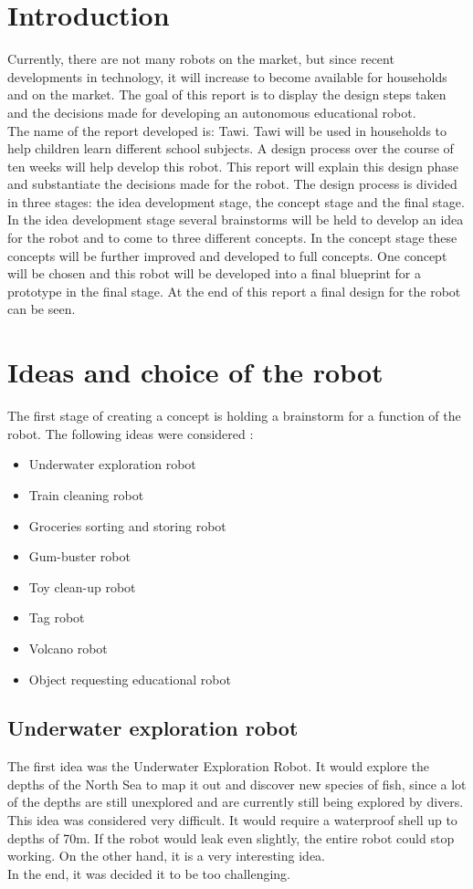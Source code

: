 \documentclass[11pt,twoside,a4paper]{report}
\begin{document}
\chapter{Introduction}
Currently, there are not many robots on the market, but since recent developments in technology, it will increase to become available for households and on the market. The goal of this report is to display the design steps taken and the decisions made for developing an autonomous educational robot.  \\ 
The name of the report developed is: Tawi. Tawi will be used in households to help children learn different school subjects. A design process over the course of ten weeks will help develop this robot. This report will explain this design phase and substantiate the decisions made for the robot. The design process is divided in three stages: the idea development stage, the concept stage and the final stage. In the idea development stage several brainstorms will be held to develop an idea for the robot and to come to three different concepts. In the concept stage these concepts will be further improved and developed to full concepts. One concept will be chosen and this robot will be developed into a final blueprint for a prototype in the final stage. At the end of this report a final design for the robot can be seen.

\chapter{Ideas and choice of the robot}
The first stage of creating a concept is holding a brainstorm for a function of the robot. The following ideas were considered : 
\begin{itemize}
\item{Underwater exploration robot}
\item{Train cleaning robot}
\item{Groceries sorting and storing robot}
\item{Gum-buster robot}
\item{Toy clean-up robot}
\item{Tag robot}
\item{Volcano robot}
\item{Object requesting educational robot}
\end{itemize}

\section{Underwater exploration robot}
The first idea was the Underwater Exploration Robot. It would explore the depths of the North Sea to map it out and discover new species of fish, since a lot of the depths are still unexplored and are currently still being explored by divers. \\
This idea was considered very difficult. It would require a waterproof shell up to depths of 70m. If the robot would leak even slightly, the entire robot could stop working. On the other hand, it is a very interesting idea. \\
In the end, it was decided it to be too challenging.
\end{document}
